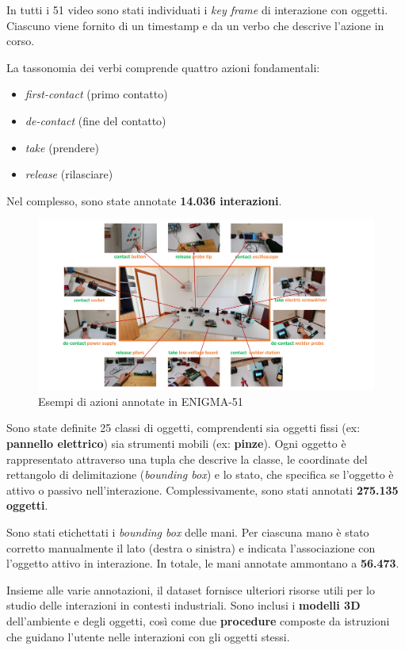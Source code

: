 In tutti i 51 video sono stati individuati i \emph{key frame} di interazione con oggetti. Ciascuno viene fornito di un timestamp e da un verbo che descrive l'azione in corso.  

La tassonomia dei verbi comprende quattro azioni fondamentali:  
\begin{itemize}
    \item \emph{first-contact} (primo contatto)  
    \item \emph{de-contact} (fine del contatto)  
    \item \emph{take} (prendere)  
    \item \emph{release} (rilasciare)  
\end{itemize}

Nel complesso, sono state annotate \textbf{14.036 interazioni}.

\begin{figure}[ht]
    \centering
    \includegraphics[width=1\linewidth]{Images/enigma_verbs.png}
    \caption{Esempi di azioni annotate in ENIGMA-51}
\end{figure}

Sono state definite 25 classi di oggetti, comprendenti sia oggetti fissi (ex: \textbf{pannello elettrico}) sia strumenti mobili (ex: \textbf{pinze}).  
Ogni oggetto è rappresentato attraverso una tupla che descrive la classe, le coordinate del rettangolo di delimitazione (\emph{bounding box}) e lo stato, che specifica se l'oggetto è attivo o passivo nell'interazione.  
Complessivamente, sono stati annotati \textbf{275.135 oggetti}.  

Sono stati etichettati i \emph{bounding box} delle mani.  
Per ciascuna mano è stato corretto manualmente il lato (destra o sinistra) e indicata l'associazione con l'oggetto attivo in interazione.  
In totale, le mani annotate ammontano a \textbf{56.473}.

Insieme alle varie annotazioni, il dataset fornisce ulteriori risorse utili per lo studio delle interazioni in contesti industriali.  
Sono inclusi i \textbf{modelli 3D} dell'ambiente e degli oggetti, così come due \textbf{procedure} composte da istruzioni che guidano l'utente nelle interazioni con gli oggetti stessi.

